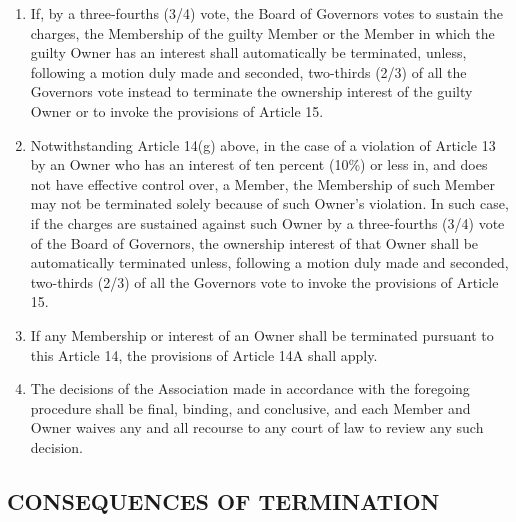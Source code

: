 \documentclass[]{book}
\begin{document}
\begin{enumerate}
\item
  If, by a three-fourths (3/4) vote, the Board of Governors votes to sustain the charges, the Membership of the guilty Member or the Member in which the guilty Owner has an interest shall automatically be terminated, unless, following a motion duly made and seconded, two-thirds (2/3) of all the Governors vote instead to terminate the ownership interest of the guilty Owner or to invoke the provisions of Article 15.
\item
  Notwithstanding Article 14(g) above, in the case of a violation of Article 13 by an Owner who has an interest of ten percent (10\%) or less in, and does not have effective control over, a Member, the Membership of such Member may not be terminated solely because of such Owner's violation. In such case, if the charges are sustained against such Owner by a three-fourths (3/4) vote of the Board of Governors, the ownership interest of that Owner shall be automatically terminated unless, following a motion duly made and seconded, two-thirds (2/3) of all the Governors vote to invoke the provisions of Article 15.
\item
  If any Membership or interest of an Owner shall be terminated pursuant to this Article 14, the provisions of Article 14A shall apply.
\item
  The decisions of the Association made in accordance with the foregoing procedure shall be final, binding, and conclusive, and each Member and Owner waives any and all recourse to any court of law to review any such decision.
\end{enumerate}

\hypertarget{consequences-of-termination}{%
\subsection{CONSEQUENCES OF TERMINATION}\label{consequences-of-termination}}
\end{document}
